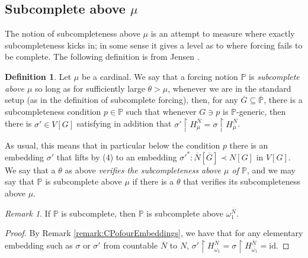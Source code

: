 \documentclass{amsart}
\theoremstyle{definition}
\newtheorem{definition}[theorem]{Definition}
\theoremstyle{remark}
\newtheorem{remark}[theorem]{Remark}
\renewcommand{\P}{\mathbb{P}}
\newcommand{\N}{{\overline{N}}}
\newcommand{\G}{\overline{G}}
\newcommand{\rest}{\mathbin{\upharpoonright}}
\begin{document}
\subsection{Subcomplete above $\mu$} \label{subsec:subcompleteabovemu}
The notion of subcompleteness above $\mu$ is an attempt to measure where exactly subcompleteness kicks in; in some sense it gives a level as to where forcing fails to be complete. 
The following definition is from Jensen \cite[Chapter 2 p.\ 47]{Jensen:2009fe}.
\begin{definition} 
Let $\mu$ be a cardinal. We say that a forcing notion $\P$ is \emph{subcomplete above $\mu$} so long as for sufficiently large $\theta > \mu$, whenever we are in the standard setup (as in the definition of subcomplete forcing),
then, for any $\G \subseteq \overline{\P}$, there is a subcompleteness condition $p \in \P$ such that whenever $G \ni p$ is $\P$-generic, then there is $\sigma' \in V[G]$ satisfying in addition that $\sigma' \rest H_{\overline \mu}^{\N} = \sigma \rest H_{\overline \mu}^{\N}$.

As usual, this means that in particular below the condition $p$ there is an embedding $\sigma'$ that lifts by (4) to an embedding $\sigma'^*:\N[\G] \prec N[G]$ in $V[G]$. We say that a $\theta$ as above \textit{verifies the subcompleteness above $\mu$ of $\P$}, and we may say that $\P$ is subcomplete above \(\mu\) if there is a $\theta$ that verifies its subcompleteness above $\mu$.
\end{definition}

\begin{remark} If $\P$ is subcomplete, then $\P$ is subcomplete above $\omega_1^{\N}$. \end{remark}
\begin{proof} By Remark \ref{remark:CPofourEmbeddings}, we have that for any elementary embedding such as $\sigma$ or $\sigma'$ from countable $\N$ to $N$, $\sigma' \rest H_{\overline{\omega_1}}^{\N} = \sigma \rest H_{\overline{\omega_1}}^{\N} = \text{id}$. \end{proof}
\end{document}
